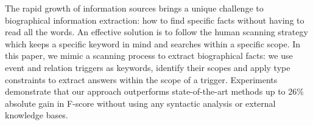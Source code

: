 The rapid growth of information sources brings a unique challenge to biographical information extraction: how to find specific facts without having to read all the words. An effective solution is to follow the human scanning strategy which keeps a specific keyword in mind and searches within a specific scope. In this paper, we mimic a scanning process to extract biographical facts: we use event and relation triggers as keywords, identify their scopes and apply type constraints to extract answers within the scope of a trigger. Experiments demonstrate that our approach outperforms state-of-the-art methods up to 26\% absolute gain in F-score without using any syntactic analysis or external knowledge bases.
